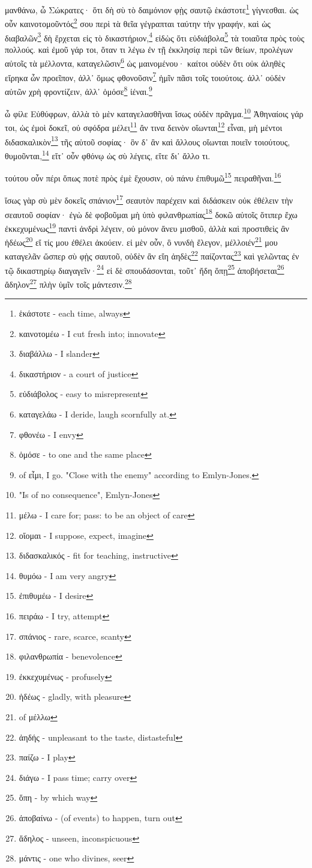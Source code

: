 μανθάνω,
ὦ
Σώκρατες·
ὅτι
δὴ
σὺ
τὸ
δαιμόνιον
φῂς
σαυτῷ
ἑκάστοτε\footnote{ἑκάστοτε - each time, always}
γίγνεσθαι.
ὡς
οὖν
καινοτομοῦντός\footnote{καινοτομέω - I cut fresh into; innovate}
σου
περὶ
τὰ
θεῖα
γέγραπται
ταύτην
τὴν
γραφήν,
καὶ
ὡς
διαβαλῶν\footnote{διαβάλλω - I slander}
δὴ
ἔρχεται
εἰς
τὸ
δικαστήριον,\footnote{δικαστήριον - a court of justice}
εἰδὼς
ὅτι
εὐδιάβολα\footnote{εὐδιάβολος - easy to misrepresent}
τὰ
τοιαῦτα
πρὸς
τοὺς
πολλούς.
καὶ
ἐμοῦ
γάρ
τοι,
\versification{[3c]}
ὅταν
τι
λέγω
ἐν
τῇ
ἐκκλησίᾳ
περὶ
τῶν
θείων,
προλέγων
αὐτοῖς
τὰ
μέλλοντα,
καταγελῶσιν\footnote{ καταγελάω - I deride, laugh scornfully at.}
ὡς
μαινομένου·
καίτοι
οὐδὲν
ὅτι
οὐκ
ἀληθὲς
εἴρηκα
ὧν
προεῖπον,
ἀλλ᾽
ὅμως
φθονοῦσιν\footnote{φθονέω - I envy}
ἡμῖν
πᾶσι
τοῖς
τοιούτοις.
ἀλλ᾽
οὐδὲν
αὐτῶν
χρὴ
φροντίζειν,
ἀλλ᾽
ὁμόσε\footnote{ὁμόσε - to one and the same place}
ἰέναι.\footnote{ of εἶμι, I go. "Close with the enemy" according to Emlyn-Jones.}

ὦ
φίλε
Εὐθύφρων,
ἀλλὰ
τὸ
μὲν
καταγελασθῆναι
ἴσως
οὐδὲν
πρᾶγμα.\footnote{"Is of no consequence", Emlyn-Jones}
Ἀθηναίοις
γάρ
τοι,
ὡς
ἐμοὶ
δοκεῖ,
οὐ
σφόδρα
μέλει\footnote{μέλω - I care for; pass: to be an object of care}
ἄν
τινα
δεινὸν
οἴωνται\footnote{οἴομαι - I suppose, expect, imagine}
εἶναι,
μὴ
μέντοι
διδασκαλικὸν\footnote{διδασκαλικός - fit for teaching, instructive}
τῆς
αὑτοῦ
σοφίας·
ὃν
δ᾽
ἂν
καὶ
ἄλλους
οἴωνται
\versification{[3d]}
ποιεῖν
τοιούτους,
θυμοῦνται,\footnote{θυμόω - I am very angry}
εἴτ᾽
οὖν
φθόνῳ
ὡς
σὺ
λέγεις,
εἴτε
δι᾽
ἄλλο
τι.

τούτου
οὖν
πέρι
ὅπως
ποτὲ
πρὸς
ἐμὲ
ἔχουσιν,
οὐ
πάνυ
ἐπιθυμῶ\footnote{ἐπιθυμέω - I desire}
πειραθῆναι.\footnote{πειράω - I try, attempt}

ἴσως
γὰρ
σὺ
μὲν
δοκεῖς
σπάνιον\footnote{σπάνιος - rare, scarce, scanty}
σεαυτὸν
παρέχειν
καὶ
διδάσκειν
οὐκ
ἐθέλειν
τὴν
σεαυτοῦ
σοφίαν·
ἐγὼ
δὲ
φοβοῦμαι
μὴ
ὑπὸ
φιλανθρωπίας\footnote{φιλανθρωπία - benevolence}
δοκῶ
αὐτοῖς
ὅτιπερ
ἔχω
ἐκκεχυμένως\footnote{ἐκκεχυμένως - profusely}
παντὶ
ἀνδρὶ
λέγειν,
οὐ
μόνον
ἄνευ
μισθοῦ,
ἀλλὰ
καὶ
προστιθεὶς
ἂν
ἡδέως\footnote{ἡδέως - gladly, with pleasure}
εἴ
τίς
μου
ἐθέλει
ἀκούειν.
εἰ
μὲν
οὖν,
ὃ
νυνδὴ
ἔλεγον,
μέλλοιέν\footnote{ of μέλλω}
μου
καταγελᾶν
ὥσπερ
\versification{[3e]}
σὺ
φῂς
σαυτοῦ,
οὐδὲν
ἂν
εἴη
ἀηδὲς\footnote{ἀηδής - unpleasant to the taste, distasteful}
παίζοντας\footnote{παίζω - I play}
καὶ
γελῶντας
ἐν
τῷ
δικαστηρίῳ
διαγαγεῖν·\footnote{διάγω - I pass time; carry over}
εἰ
δὲ
σπουδάσονται,
τοῦτ᾽
ἤδη
ὅπῃ\footnote{ὅπη - by which way}
ἀποβήσεται\footnote{ἀποβαίνω - (of events) to happen, turn out}
ἄδηλον\footnote{ἄδηλος - unseen, inconspicuous}
πλὴν
ὑμῖν
τοῖς
μάντεσιν.\footnote{μάντις - one who divines, seer}


